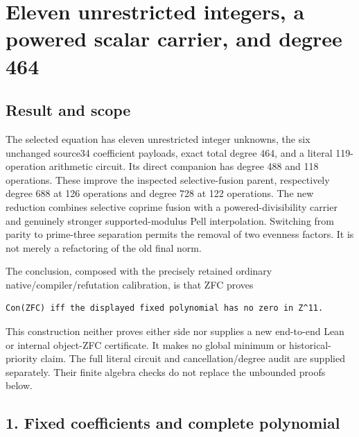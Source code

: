 \section{Eleven unrestricted integers, a powered scalar carrier, and degree 464}



\subsection*{Result and scope}



The selected equation has eleven unrestricted integer unknowns, the six unchanged source34 coefficient payloads, exact total degree 464, and a literal 119-operation arithmetic circuit. Its direct companion has degree 488 and 118 operations. These improve the inspected selective-fusion parent, respectively degree 688 at 126 operations and degree 728 at 122 operations. The new reduction combines selective coprime fusion with a powered-divisibility carrier and genuinely stronger supported-modulus Pell interpolation. Switching from parity to prime-three separation permits the removal of two evenness factors. It is not merely a refactoring of the old final norm.



The conclusion, composed with the precisely retained ordinary native/\allowbreak{}compiler/\allowbreak{}refutation calibration, is that ZFC proves



\begin{verbatim}
Con(ZFC) iff the displayed fixed polynomial has no zero in Z^11.
\end{verbatim}

This construction neither proves either side nor supplies a new end-to-end Lean or internal object-ZFC certificate. It makes no global minimum or historical-priority claim. The full literal circuit and cancellation/\allowbreak{}degree audit are supplied separately. Their finite algebra checks do not replace the unbounded proofs below.



\subsection*{1. Fixed coefficients and complete polynomial}



